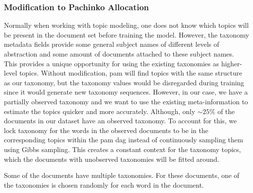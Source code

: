 




\subsubsection{Modification to Pachinko Allocation}\label{subsec:mod_pachinko}
Normally when working with topic modeling, one does not know which topics will be present in the document set before training the model.
However, the taxonomy metadata fields provide some general subject names of different levels of abstraction and some amount of documents attached to these subject names.
This provides a unique opportunity for using the existing taxonomies as higher-level topics.
Without modification, \gls{pam} will find topics with the same structure as our taxonomy, but the taxonomy values would be disregarded during training since it would generate new taxonomy sequences.
However, in our case, we have a partially observed taxonomy and we want to use the existing meta-information to estimate the topics quicker and more accurately.
Although, only ${\sim}25\%$ of the documents in our dataset have an observed taxonomy.
To account for this, we lock taxonomy for the words in the observed documents to be in the corresponding topics within the \gls{pam} \gls{dag} instead of continuously sampling them using Gibbs sampling.
This creates a constant context for the taxonomy topics, which the documents with unobserved taxonomies will be fitted around.

Some of the documents have multiple taxonomies.
For these documents, one of the taxonomies is chosen randomly for each word in the document. 
